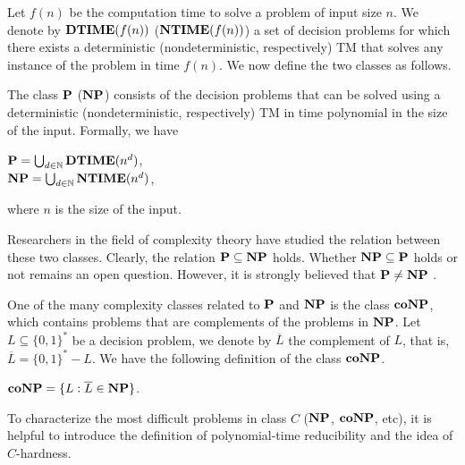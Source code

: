 Let $f(n)$ be the computation time to solve a problem of input size $n$.
We denote by $\textbf{DTIME}(f(n))$ ($\textbf{NTIME}(f(n))$) a set of decision problems 
for which there exists a deterministic (nondeterministic, respectively) TM
that solves any instance of the problem in time $f(n)$.
We now define the two classes as follows.

\begin{definition}
	The class $\textbf{P}$ ($\textbf{NP}$) consists of the decision problems that can be solved using a 
	deterministic (nondeterministic, respectively) TM 
	in time polynomial in the size of the input.  Formally, we have
	\begin{center}
		$\textbf{P} = \bigcup_{d \in \mathbb{N}} \textbf{DTIME}(n^d)$,\\
		$\textbf{NP} = \bigcup_{d \in \mathbb{N}} \textbf{NTIME}(n^d)$,
	\end{center}
	where $n$ is the size of the input.
\end{definition}

Researchers in the field of complexity theory have studied
the relation between these two classes.
Clearly, the relation $\textbf{P} \subseteq \textbf{NP}$ holds. Whether
$\textbf{NP} \subseteq \textbf{P}$ holds or not remains an open question.
However, it is strongly believed that $\textbf{P} \not = \textbf{NP}$ \cite{gasarch2002p}. 


One of the many complexity classes related to $\textbf{P}$ and $\textbf{NP}$ \cite{gasarch2002p}
is the class $\textbf{coNP}$, which contains problems that are complements of 
the problems in $\textbf{NP}$.
Let $L \subseteq \{0,1\}^*$ be a decision problem, we denote by $\overline{L}$ the
complement of $L$, that is, $\overline{L} = \{0,1\}^*-L$.
We have the following definition of the class $\textbf{coNP}$.

\begin{definition}
	$\textbf{coNP} = \{L : \overline{L} \in \textbf{NP}\}$.
\end{definition}

To characterize the most difficult problems in class $C$ ($\textbf{NP}$, $\textbf{coNP}$, etc), 
it is helpful to introduce
the definition of polynomial-time reducibility \cite{gasarch2002p} and the 
idea of $C$-hardness.

